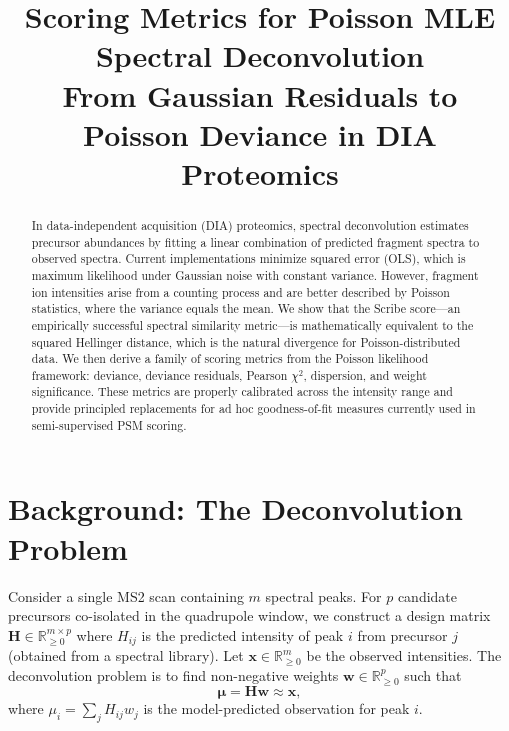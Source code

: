 \documentclass[11pt,a4paper]{article}
\title{Scoring Metrics for Poisson MLE Spectral Deconvolution\\[0.5em]
\large From Gaussian Residuals to Poisson Deviance in DIA Proteomics}
\author{}
\date{}
\begin{document}
\maketitle

\begin{abstract}
In data-independent acquisition (DIA) proteomics, spectral deconvolution estimates
precursor abundances by fitting a linear combination of predicted fragment spectra to
observed spectra. Current implementations minimize squared error (OLS), which is
maximum likelihood under Gaussian noise with constant variance. However, fragment ion
intensities arise from a counting process and are better described by Poisson statistics,
where the variance equals the mean. We show that the Scribe score---an empirically
successful spectral similarity metric---is mathematically equivalent to the squared
Hellinger distance, which is the natural divergence for Poisson-distributed data. We then
derive a family of scoring metrics from the Poisson likelihood framework: deviance,
deviance residuals, Pearson $\chi^2$, dispersion, and weight significance. These metrics
are properly calibrated across the intensity range and provide principled replacements for
ad hoc goodness-of-fit measures currently used in semi-supervised PSM scoring.
\end{abstract}

\tableofcontents

\section{Background: The Deconvolution Problem}

Consider a single MS2 scan containing $m$ spectral peaks. For $p$ candidate precursors
co-isolated in the quadrupole window, we construct a design matrix
$\mathbf{H} \in \mathbb{R}_{\geq 0}^{m \times p}$ where $H_{ij}$ is the predicted
intensity of peak $i$ from precursor $j$ (obtained from a spectral library). Let
$\mathbf{x} \in \mathbb{R}_{\geq 0}^m$ be the observed intensities. The deconvolution
problem is to find non-negative weights $\mathbf{w} \in \mathbb{R}_{\geq 0}^p$ such that
\begin{equation}
    \boldsymbol{\mu} = \mathbf{H}\mathbf{w} \approx \mathbf{x},
\end{equation}
where $\mu_i = \sum_j H_{ij} w_j$ is the model-predicted observation for peak $i$.
\end{document}
